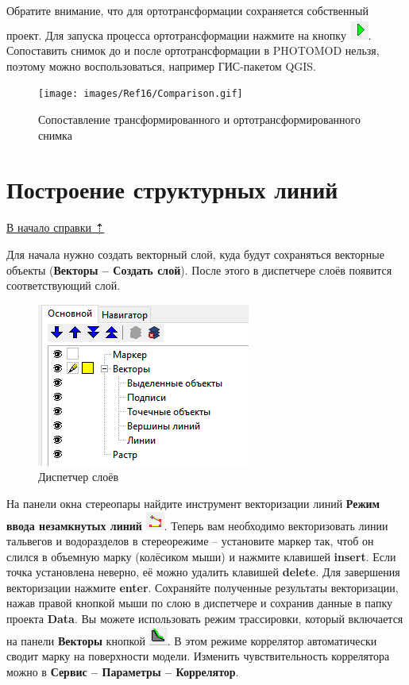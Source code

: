\documentclass[
  12pt,
]{book}
\begin{document}
Обратите внимание, что для ортотрансформации сохраняется собственный проект. Для запуска процесса ортотрансформации нажмите на кнопку \includegraphics{images/Ref16/Run.png}. Сопоставить снимок до и после ортотрансформации в PHOTOMOD нельзя, поэтому можно воспользоваться, например ГИС-пакетом QGIS.

\begin{figure}
\centering
\texttt{[image: images/Ref16/Comparison.gif]}
\caption{Сопоставление трансформированного и ортотрансформированного снимка}
\end{figure}

\hypertarget{photomod_DEM-structure_lines}{%
\section{Построение структурных линий}\label{photomod_DEM-structure_lines}}

\protect\hyperlink{photomod_DEM}{В начало справки ⇡}

Для начала нужно создать векторный слой, куда будут сохраняться векторные объекты (\textbf{Векторы -- Создать слой}). После этого в диспетчере слоёв появится соответствующий слой.

\begin{figure}
\centering
\includegraphics{images/Ref16/Layers.png}
\caption{Диспетчер слоёв}
\end{figure}

На панели окна стереопары найдите инструмент векторизации линий \textbf{Режим ввода незамкнутых линий} \includegraphics{images/Ref16/Polyline.png}. Теперь вам необходимо векторизовать линии тальвегов и водоразделов в стереорежиме -- установите маркер так, чтоб он слился в объемную марку (колёсиком мыши) и нажмите клавишей \textbf{insert}. Если точка установлена неверно, её можно удалить клавишей \textbf{delete}. Для завершения векторизации нажмите \textbf{enter}. Сохраняйте полученные результаты векторизации, нажав правой кнопкой мыши по слою в диспетчере и сохранив данные в папку проекта \textbf{Data}. Вы можете использовать режим трассировки, который включается на панели \textbf{Векторы} кнопкой \includegraphics{images/Ref16/Tracing.png}. В этом режиме коррелятор автоматически сводит марку на поверхности модели. Изменить чувствительность коррелятора можно в \textbf{Сервис -- Параметры -- Коррелятор}.
\end{document}
